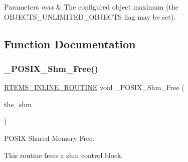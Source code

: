 \begin{DoxyParams}{Parameters}
{\em max} & The configured object maximum (the O\+B\+J\+E\+C\+T\+S\+\_\+\+U\+N\+L\+I\+M\+I\+T\+E\+D\+\_\+\+O\+B\+J\+E\+C\+TS flag may be set). \\
\hline
\end{DoxyParams}


\subsection{Function Documentation}
\mbox{\label{group__POSIXShmPrivate_ga6e1dcb58b602cf17eda5f3a3112a31ba}} 
\subsubsection{\texorpdfstring{\_POSIX\_Shm\_Free()}{\_POSIX\_Shm\_Free()}}
{\footnotesize\ttfamily \mbox{\hyperlink{group__RTEMSScoreBaseDefs_gac216239df231d5dbd15e3520b0b9313f}{R\+T\+E\+M\+S\+\_\+\+I\+N\+L\+I\+N\+E\+\_\+\+R\+O\+U\+T\+I\+NE}} void \+\_\+\+P\+O\+S\+I\+X\+\_\+\+Shm\+\_\+\+Free (\begin{DoxyParamCaption}\item[{\mbox{\hyperlink{structPOSIX__Shm__Control}{P\+O\+S\+I\+X\+\_\+\+Shm\+\_\+\+Control}} $\ast$}]{the\+\_\+shm }\end{DoxyParamCaption})}



P\+O\+S\+IX Shared Memory Free. 

This routine frees a shm control block. 